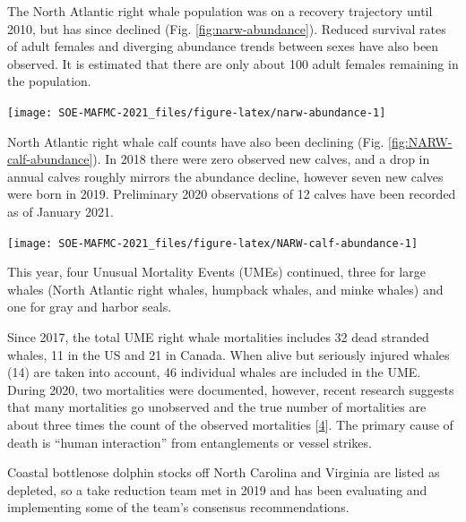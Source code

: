 \documentclass[
  10pt,
]{article}
\let\origfigure\figure
\let\endorigfigure\endfigure
\renewenvironment{figure}[1][2] {
    \expandafter\origfigure\expandafter[H]
} {
    \endorigfigure
}
\begin{document}
The North Atlantic right whale population was on a recovery trajectory
until 2010, but has since declined (Fig. \ref{fig:narw-abundance}).
Reduced survival rates of adult females and diverging abundance trends
between sexes have also been observed. It is estimated that there are
only about 100 adult females remaining in the population.

\begin{figure}

{\centering \texttt{[image: SOE-MAFMC-2021\_files/figure-latex/narw-abundance-1]} 

}

\caption{Estimated North Atlanic right whale abundance on the Northeast Shelf.}\label{fig:narw-abundance}
\end{figure}

North Atlantic right whale calf counts have also been declining (Fig.
\ref{fig:NARW-calf-abundance}). In 2018 there were zero observed new
calves, and a drop in annual calves roughly mirrors the abundance
decline, however seven new calves were born in 2019. Preliminary 2020
observations of 12 calves have been recorded as of January 2021.\\

\begin{figure}

{\centering \texttt{[image: SOE-MAFMC-2021\_files/figure-latex/NARW-calf-abundance-1]} 

}

\caption{Number of North Atlantic right whale calf births, 1990 - 2019.}\label{fig:NARW-calf-abundance}
\end{figure}

This year, four Unusual Mortality Events (UMEs) continued, three for
large whales (North Atlantic right whales, humpback whales, and minke
whales) and one for gray and harbor seals.

Since 2017, the total UME right whale mortalities includes 32 dead
stranded whales, 11 in the US and 21 in Canada. When alive but seriously
injured whales (14) are taken into account, 46 individual whales are
included in the UME. During 2020, two mortalities were documented,
however, recent research suggests that many mortalities go unobserved
and the true number of mortalities are about three times the count of
the observed mortalities
{[}\protect\hyperlink{ref-pace_cryptic_2021}{4}{]}. The primary cause of
death is ``human interaction'' from entanglements or vessel strikes.

Coastal bottlenose dolphin stocks off North Carolina and Virginia are
listed as depleted, so a take reduction team met in 2019 and has been
evaluating and implementing some of the team's consensus
recommendations.
\end{document}
